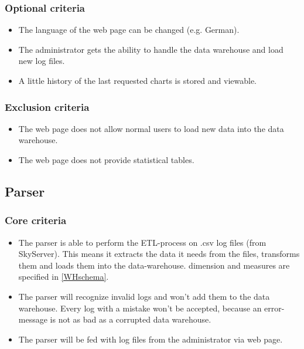 \subsubsection{Optional criteria}
\begin{itemize}
\item The language of the web page can be changed (e.g. German).

\item The administrator gets the ability to handle the \gls{data warehouse} and load new \glspl{log file}.

\item A little history of the last requested charts is stored and viewable.
\end{itemize}

\subsubsection{Exclusion criteria}
\begin{itemize}
\item The web page does not allow normal users to load new data into the \gls{data warehouse}.

\item The web page does not provide statistical tables. 
\end{itemize}


\subsection{Parser}

\subsubsection{Core criteria} %
\begin{itemize}
\item The \gls{parser} is able to perform the \gls{ETL-process} on \gls{.csv} \glspl{log file}
 (from \gls{SkyServer}). 
This means it extracts the data it needs from the files, transforms them 
and loads them into the data-warehouse. \gls{dimension} and measures are specified in \ref{WHschema}.
  
\item The \gls{parser} will recognize invalid logs and won't add them to the \gls{data warehouse}.
 Every log with a mistake won't be accepted, because an error-message is not 
 as bad as a corrupted \gls{data warehouse}. 
 
\item The \gls{parser} will be fed with \glspl{log file} from the administrator via web page.
\end{itemize} 

